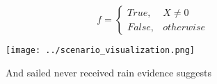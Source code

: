 \documentclass[a4paper]{article}
\begin{document}
\begin{equation}   f =
\begin{cases} True, & X \neq 0\\
False, & otherwise
\end{cases}
\end{equation}

\begin{figure}
\centering
\texttt{[image: ../scenario\_visualization.png]}
\caption{And sailed never received rain evidence suggests 
}
\end{figure}
 
\end{document}
